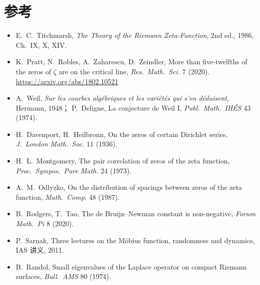 \documentclass[11pt]{article}
\begin{document}
\section*{参考}
\begin{itemize}
 \item E.\ C.\ Titchmarsh, \emph{The Theory of the Riemann Zeta-Function}, 2nd ed., 1986, Ch.~IX, X, XIV.
 \item K.\ Pratt, N.\ Robles, A.\ Zaharescu, D.\ Zeindler, More than five-twelfths of the zeros of $\zeta$ are on the critical line,
 \emph{Res.\ Math.\ Sci.} 7 (2020). \url{https://arxiv.org/abs/1802.10521}
 \item A.\ Weil, \emph{Sur les courbes algébriques et les variétés qui s'en déduisent}, Hermann, 1948；
 P.\ Deligne, La conjecture de Weil I, \emph{Publ.\ Math.\ IHÉS} 43 (1974).
 \item H.\ Davenport, H.\ Heilbronn, On the zeros of certain Dirichlet series, \emph{J.\ London Math.\ Soc.} 11 (1936).
 \item H.\ L.\ Montgomery, The pair correlation of zeros of the zeta function, \emph{Proc.\ Sympos.\ Pure Math.} 24 (1973).
 \item A.\ M.\ Odlyzko, On the distribution of spacings between zeros of the zeta function, \emph{Math.\ Comp.} 48 (1987).
 \item B.\ Rodgers, T.\ Tao, The de Bruijn--Newman constant is non-negative, \emph{Forum Math.\ Pi} 8 (2020).
 \item P.\ Sarnak, Three lectures on the Möbius function, randomness and dynamics, IAS 讲义, 2011.
 \item B.\ Randol, Small eigenvalues of the Laplace operator on compact Riemann surfaces, \emph{Bull.\ AMS} 80 (1974).
\end{itemize}
\end{document}
